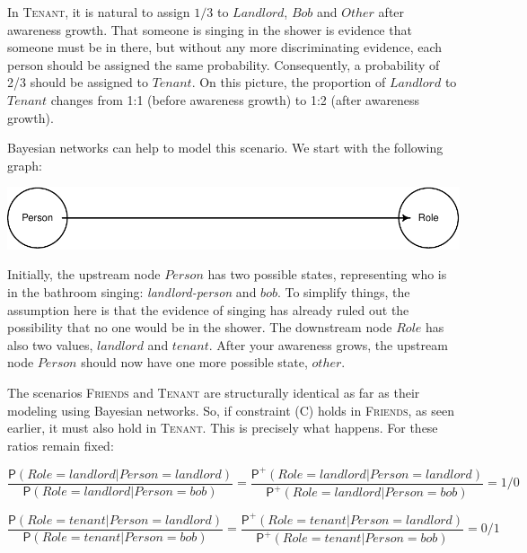 \documentclass[
  11pt,
  dvipsnames,enabledeprecatedfontcommands]{scrartcl}
\newcommand{\pr}[1]{\ensuremath{\mathsf{P}(#1)}}
\newcommand{\ppr}[2]{\ensuremath{\mathsf{P}^{#1}(#2)}}
\begin{document}
In \textsc{Tenant}, it is natural to assign \(1/3\) to \(Landlord\),
\(Bob\) and \(Other\) after awareness growth. That someone is singing in
the shower is evidence that someone must be in there, but without any
more discriminating evidence, each person should be assigned the same
probability. Consequently, a probability of 2/3 should be assigned to
\(Tenant\). On this picture, the proportion of \(Landlord\) to
\(Tenant\) changes from 1:1 (before awareness growth) to 1:2 (after
awareness growth).

Bayesian networks can help to model this scenario. We start with the
following graph:

\begin{center}\includegraphics[width=0.5\linewidth,height=0.3\textheight]{ReplyToSteeleStefansson5_files/figure-latex/tenantsDAG-new-1} \end{center}

\noindent Initially, the upstream node \(Person\) has two possible
states, representing who is in the bathroom singing:
\textit{landlord-person} and \(bob\). To simplify things, the assumption
here is that the evidence of singing has already ruled out the
possibility that no one would be in the shower. The downstream node
\(Role\) has also two values, \(landlord\) and \(tenant\). After your
awareness grows, the upstream node \(Person\) should now have one more
possible state, \(other\).

The scenarios \textsc{Friends} and \textsc{Tenant} are structurally
identical as far as their modeling using Bayesian networks. So, if
constraint (C) holds in \textsc{Friends}, as seen earlier, it must also
hold in \textsc{Tenant}. This is precisely what happens. For these
ratios remain fixed:

\[\frac{\pr{\textit{Role}=\textit{landlord} \vert \textit{Person}=\textit{landlord}}}{\pr{\textit{Role}=\textit{landlord} \vert \textit{Person}=\textit{bob}}} = \frac{\ppr{+}{\textit{Role}=\textit{landlord} \vert \textit{Person}=\textit{landlord}}}{\ppr{+}{\textit{Role}=\textit{landlord} \vert \textit{Person}=\textit{bob}}} = 1/0\]

\[\frac{\pr{\textit{Role}=\textit{tenant} \vert \textit{Person}=\textit{landlord}}}{\pr{\textit{Role}=\textit{tenant} \vert \textit{Person}=\textit{bob}}} = \frac{\ppr{+}{\textit{Role}=\textit{tenant} \vert \textit{Person}=\textit{landlord}}}{\ppr{+}{\textit{Role}=\textit{tenant} \vert \textit{Person}=\textit{bob}}} = 0/1\]
\end{document}
